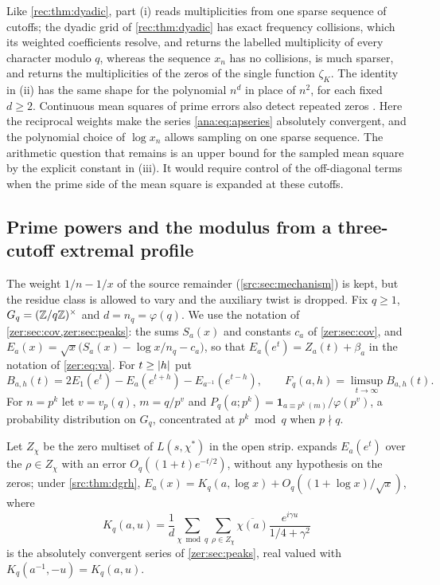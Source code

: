 Like \cref{rec:thm:dyadic}, part (i) reads multiplicities from one sparse sequence of cutoffs; the
dyadic grid of \cref{rec:thm:dyadic} has exact frequency collisions, which its weighted coefficients
resolve, and returns the labelled multiplicity of every character modulo $q$, whereas the sequence
$x_n$ has no collisions, is much sparser, and returns the multiplicities of the zeros of the single
function $\zeta_K$. The identity in (ii) has the same shape for the polynomial $n^d$ in place of $n^2$, for each
fixed $d\ge2$. Continuous mean squares of prime errors also detect repeated zeros
\cite{Caceres2026Constant}. Here the reciprocal weights make the series
\eqref{ana:eq:apseries} absolutely convergent, and the polynomial choice of $\log x_n$ allows
sampling on one sparse sequence. The arithmetic question that remains is an upper bound for
the sampled mean square by the explicit constant in (iii). It would require control of the
off-diagonal terms when the prime side of the mean square is expanded at these cutoffs.

\subsection{Prime powers and the modulus from a three-cutoff extremal profile}\label{rec:sec:profile}

The weight $1/n-1/x$ of the source remainder (\cref{src:sec:mechanism}) is kept, but the residue
class is allowed to vary and the auxiliary twist is dropped. Fix $q\ge1$, $G_q=(\mathbb{Z}/q\mathbb{Z})^\times$
and $d=n_q=\varphi(q)$. We use the notation of \cref{zer:sec:cov,zer:sec:peaks}: the sums $S_a(x)$
and constants $c_a$ of \cref{zer:sec:cov}, and
$E_a(x)=\sqrt x\bigl(S_a(x)-\log x/n_q-c_a\bigr)$, so that $E_a(e^t)=Z_a(t)+\beta_a$ in the notation of
\eqref{zer:eq:va}. For $t\ge\lvert h\rvert$ put
\[
 B_{a,h}(t)=2E_1(e^t)-E_a(e^{t+h})-E_{a^{-1}}(e^{t-h}),\qquad F_q(a,h)=\limsup_{t\to\infty}B_{a,h}(t).
\]
For $n=p^k$ let $v=v_p(q)$, $m=q/p^v$ and $P_q(a;p^k)=\mathbf 1_{a\equiv p^k\ (m)}/\varphi(p^v)$, a
probability distribution on $G_q$, concentrated at $p^k\bmod q$ when $p\nmid q$.

Let $Z_\chi$ be the zero multiset of $L(s,\chi^*)$ in the open strip.  expands
$E_a(e^t)$ over the $\rho\in Z_\chi$ with an error $O_q((1+t)e^{-t/2})$, without any hypothesis on the
zeros; under \cref{src:thm:dgrh}, $E_a(x)=K_q(a,\log x)+O_q((1+\log x)/\sqrt x)$, where
\[
 K_q(a,u)=\frac1d\sum_{\chi\bmod q}\sum_{\rho\in Z_\chi}\overline{\chi(a)}\frac{e^{i\gamma u}}{1/4+\gamma^2}
\]
is the absolutely convergent series of \cref{zer:sec:peaks}, real valued with
$K_q(a^{-1},-u)=K_q(a,u)$.

